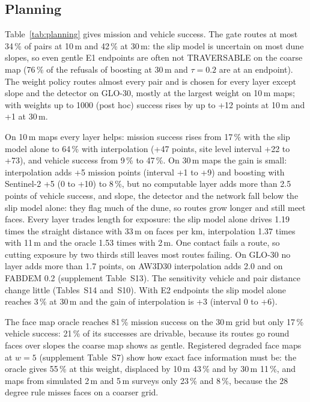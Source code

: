 \documentclass[conference]{IEEEtran}
\begin{document}
\subsection{Planning}
Table~\ref{tab:planning} gives mission and vehicle success. The gate routes at most 34\,\% of pairs at 10\,m and 42\,\% at 30\,m: the slip model is uncertain on most dune slopes, so even gentle E1 endpoints are often not TRAVERSABLE on the coarse map (76\,\% of the refusals of boosting at 30\,m and $\tau=0.2$ are at an endpoint). The weight policy routes almost every pair and is chosen for every layer except slope and the detector on GLO-30, mostly at the largest weight on 10\,m maps; with weights up to 1000 (post hoc) success rises by up to +12 points at 10\,m and +1 at 30\,m.

On 10\,m maps every layer helps: mission success rises from 17\,\% with the slip model alone to 64\,\% with interpolation (+47 points, site level interval +22 to +73), and vehicle success from 9\,\% to 47\,\%. On 30\,m maps the gain is small: interpolation adds +5 mission points (interval +1 to +9) and boosting with Sentinel-2 +5 (0 to +10) to 8\,\%, but no computable layer adds more than 2.5 points of vehicle success, and slope, the detector and the network fall below the slip model alone: they flag much of the dune, so routes grow longer and still meet faces. Every layer trades length for exposure: the slip model alone drives 1.19 times the straight distance with 33\,m on faces per km, interpolation 1.37 times with 11\,m and the oracle 1.53 times with 2\,m. One contact fails a route, so cutting exposure by two thirds still leaves most routes failing. On GLO-30 no layer adds more than 1.7 points, on AW3D30 interpolation adds 2.0 and on FABDEM 0.2 (supplement Table~S13). The sensitivity vehicle and pair distance change little (Tables~S14 and~S10). With E2 endpoints the slip model alone reaches 3\,\% at 30\,m and the gain of interpolation is +3 (interval 0 to +6).

The face map oracle reaches 81\,\% mission success on the 30\,m grid but only 17\,\% vehicle success: 21\,\% of its successes are drivable, because its routes go round faces over slopes the coarse map shows as gentle. Registered degraded face maps at $w=5$ (supplement Table~S7) show how exact face information must be: the oracle gives 55\,\% at this weight, displaced by 10\,m 43\,\% and by 30\,m 11\,\%, and maps from simulated 2\,m and 5\,m surveys only 23\,\% and 8\,\%, because the 28\,degree rule misses faces on a coarser grid.
\end{document}
